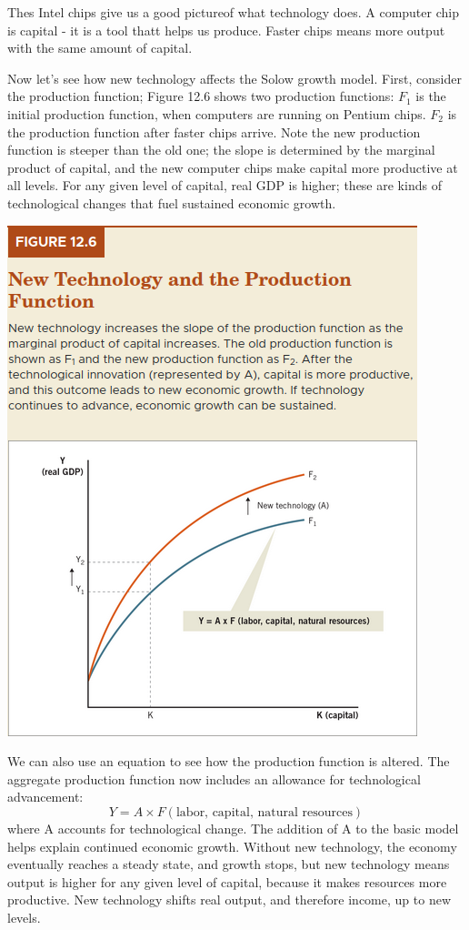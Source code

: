 \documentclass[11pt]{article} %
\begin{document}
Thes Intel chips give us a good pictureof what technology does. A computer chip is capital - it is a tool thatt helps us produce. Faster chips means more output with the same amount of capital.

Now let's see how new technology affects the Solow growth model. First, consider the production function; Figure 12.6 shows two production functions: \(F_1\) is the initial production function, when computers are running on Pentium chips. \(F_2\) is the production function after faster chips arrive. Note the new production function is steeper than the old one; the slope is determined by the marginal product of capital, and the new computer chips make capital more productive at all levels. For any given level of capital, real GDP is higher; these are kinds of technological changes that fuel sustained economic growth.
\begin{center}
\includegraphics[scale=0.5]{Images/Figure 12.6.png}
\end{center}
We can also use an equation to see how the production function is altered. The aggregate production function now includes an allowance for technological advancement:
\begin{equation}
Y = A \times F (\text{labor, capital, natural resources})
\end{equation}
where A accounts for technological change. The addition of A to the basic model helps explain continued economic growth. Without new technology, the economy eventually reaches a steady state, and growth stops, but new technology means output is higher for any given level of capital, because it makes resources more productive. New technology shifts real output, and therefore income, up to new levels.
\end{document}
